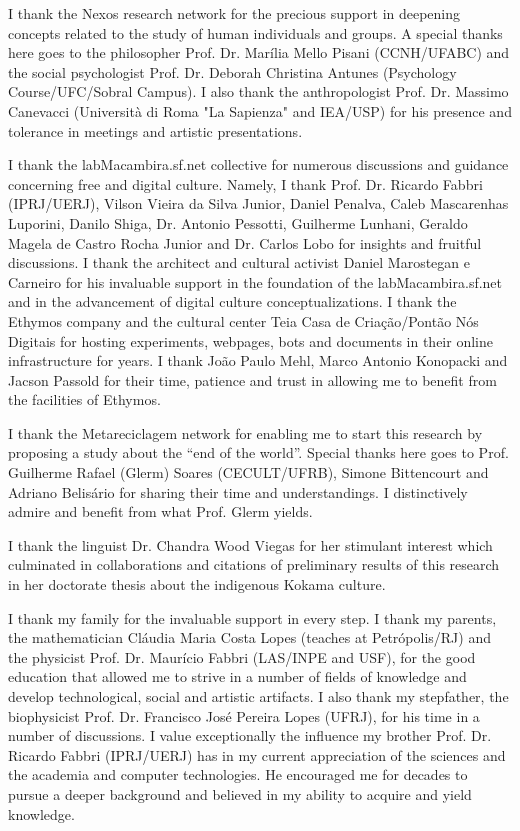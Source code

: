 \documentclass[
12pt,		%
openright,	%
twoside,  %
a4paper,			%
chapter=TITLE,		%
english,			%
french,				%
spanish,			%
brazil				%
]{USPSC}
\begin{document}
\begin{agradecimentos}
I thank the Nexos research network for the precious support in deepening concepts related
to the study of human individuals and groups.
A special thanks here goes to the philosopher Prof. Dr. Marília Mello Pisani (CCNH/UFABC) and the social psychologist 
	Prof. Dr. Deborah Christina Antunes (Psychology Course/UFC/Sobral Campus).
I also thank the anthropologist Prof. Dr. Massimo Canevacci (Università di Roma "La Sapienza" and IEA/USP)
for his presence and tolerance in meetings and artistic presentations.

I thank the labMacambira.sf.net collective for numerous discussions and guidance
concerning free and digital culture.
Namely, I thank Prof. Dr. Ricardo Fabbri (IPRJ/UERJ), Vilson Vieira da Silva Junior, Daniel Penalva, Caleb Mascarenhas Luporini, Danilo Shiga,
Dr. Antonio Pessotti, Guilherme Lunhani, Geraldo Magela de Castro Rocha Junior and Dr. Carlos Lobo for insights and fruitful discussions.
I thank the architect and cultural activist Daniel Marostegan e Carneiro for his invaluable support in
the foundation of the labMacambira.sf.net and in the advancement of digital culture conceptualizations.
I thank the Ethymos company and the cultural center Teia Casa de Criação/Pontão Nós Digitais for hosting experiments, webpages, bots and documents in their online infrastructure for years.
I thank João Paulo Mehl, Marco Antonio Konopacki and Jacson Passold for their time, patience and trust in allowing me to benefit from the facilities of Ethymos.

I thank the Metareciclagem network for enabling me to start this research by proposing
a study about the ``end of the world''.
	Special thanks here goes to Prof. Guilherme Rafael (Glerm) Soares (CECULT/UFRB), Simone Bittencourt and Adriano Belisário
for sharing their time and understandings.
I distinctively admire and benefit from what Prof. Glerm yields.

I thank the linguist Dr. Chandra Wood Viegas for her stimulant interest
which culminated in collaborations and citations of preliminary results of this research in her doctorate thesis
	about the indigenous Kokama culture.

I thank my family for the invaluable support in every step.
I thank my parents, the mathematician Cláudia Maria Costa Lopes (teaches at Petrópolis/RJ) and the
physicist Prof. Dr. Maurício Fabbri (LAS/INPE and USF), for the good education that
allowed me to strive in a number of fields of knowledge 
and develop technological, social and artistic artifacts.
I also thank my stepfather, the biophysicist Prof. Dr. Francisco José Pereira Lopes (UFRJ),
for his time in a number of discussions.
I value exceptionally the influence my brother Prof. Dr. Ricardo Fabbri (IPRJ/UERJ)
has in my current appreciation
of the sciences and the academia and computer technologies.
He encouraged me for decades to pursue a deeper background and believed in my ability to acquire and yield knowledge.


\end{agradecimentos}
\end{document}
